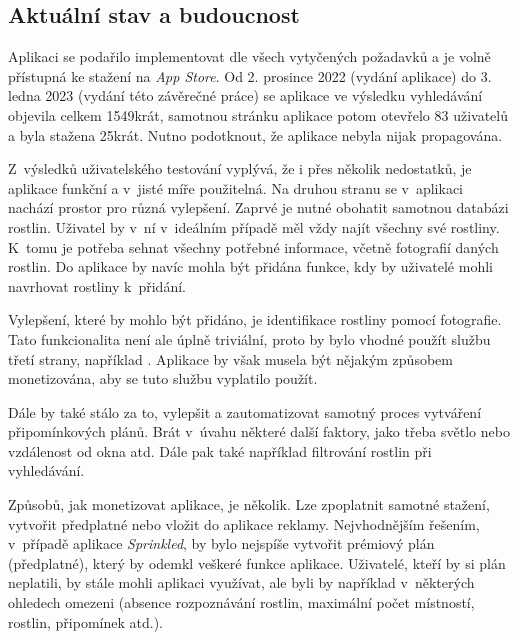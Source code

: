 \documentclass[thesis=M,czech]{FITthesis}[2019/12/23]
\begin{document}
\begin{conclusion}
\section*{Aktuální stav a budoucnost}
Aplikaci se podařilo implementovat dle všech vytyčených požadavků a je volně přístupná ke stažení na \textit{App Store}. Od 2. prosince 2022 (vydání aplikace) do 3. ledna 2023 (vydání této závěrečné práce) se aplikace ve výsledku vyhledávání objevila celkem 1549krát, samotnou stránku aplikace potom otevřelo 83 uživatelů a byla stažena 25krát. Nutno podotknout, že aplikace nebyla nijak propagována.

Z~výsledků uživatelského testování vyplývá, že i přes několik nedostatků, je aplikace funkční a v~jisté míře použitelná. Na druhou stranu se v~aplikaci nachází prostor pro různá vylepšení. Zaprvé je nutné obohatit samotnou databázi rostlin. Uživatel by v~ní v~ideálním případě měl vždy najít všechny své rostliny. K~tomu je potřeba sehnat všechny potřebné informace, včetně fotografií daných rostlin. Do aplikace by navíc mohla být přidána funkce, kdy by uživatelé mohli navrhovat rostliny k~přidání.

Vylepšení, které by mohlo být přidáno, je identifikace rostliny pomocí fotografie. Tato funkcionalita není ale úplně triviální, proto by bylo vhodné použít službu třetí strany, například \cite{plantid}. Aplikace by však musela být nějakým způsobem monetizována, aby se tuto službu vyplatilo použít. 

Dále by také stálo za to, vylepšit a zautomatizovat samotný proces vytváření připomínkových plánů. Brát v~úvahu některé další faktory, jako třeba světlo nebo vzdálenost od okna atd. Dále pak také například filtrování rostlin při vyhledávání.

Způsobů, jak monetizovat aplikace, je několik. Lze zpoplatnit samotné stažení, vytvořit předplatné nebo vložit do aplikace reklamy. Nejvhodnějším řešením, v~případě aplikace \textit{Sprinkled}, by bylo nejspíše vytvořit prémiový plán (předplatné), který by odemkl veškeré funkce aplikace. Uživatelé, kteří by si plán neplatili, by stále mohli aplikaci využívat, ale byli by například v~některých ohledech omezeni (absence rozpoznávání rostlin, maximální počet místností, rostlin, připomínek atd.).

\end{conclusion}

\printbibliography

\appendix

\end{document}
